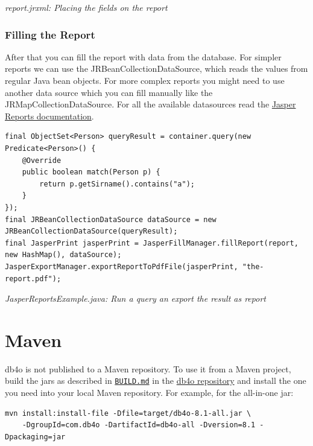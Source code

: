 {\small\itshape report.jrxml: Placing the fields on the report\par}
\medskip

\subsubsection*{Filling the Report}

After that you can fill the report with data from the database. For simpler reports we can use the JRBeanCollectionDataSource, which reads the values from regular Java bean objects. For more complex reports you might need to use another data source which you can fill manually like the JRMapCollectionDataSource. For all the available datasources read the \href{https://github.com/TIBCOSoftware/jasperreports}{Jasper Reports documentation}.

\begin{lstlisting}
final ObjectSet<Person> queryResult = container.query(new Predicate<Person>() {
    @Override
    public boolean match(Person p) {
        return p.getSirname().contains("a");
    }
});
final JRBeanCollectionDataSource dataSource = new JRBeanCollectionDataSource(queryResult);
final JasperPrint jasperPrint = JasperFillManager.fillReport(report, new HashMap(), dataSource);
JasperExportManager.exportReportToPdfFile(jasperPrint, "the-report.pdf");
\end{lstlisting}

{\small\itshape JasperReportsExample.java: Run a query an export the result as report\par}
\medskip

\section{Maven}
\label{ref:platform-specific-issues-maven}

db4o is not published to a Maven repository. To use it from a Maven project, build the jars as described in \href{https://github.com/blakemcbride/db4o/blob/master/BUILD.md}{\nolinkurl{BUILD.md}} in the \href{https://github.com/blakemcbride/db4o}{db4o repository} and install the one you need into your local Maven repository. For example, for the all-in-one jar:

\begin{lstlisting}
mvn install:install-file -Dfile=target/db4o-8.1-all.jar \
    -DgroupId=com.db4o -DartifactId=db4o-all -Dversion=8.1 -Dpackaging=jar
\end{lstlisting}

